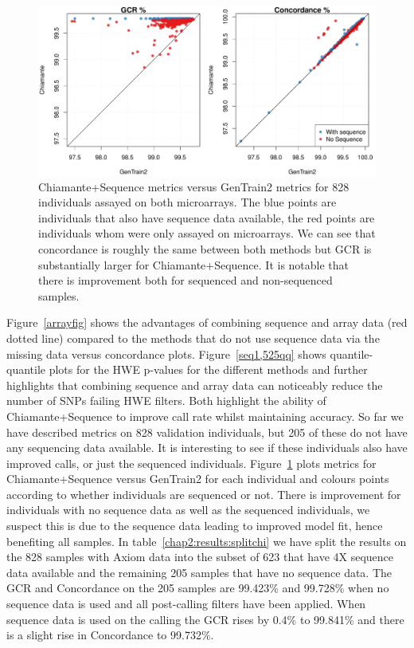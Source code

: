\begin{figure}[p]
  \begin{center} 
    \includegraphics[width=\textwidth]{chap2figs/genotypecalling_byindv}
    \caption[Chiamante versus GenTrain2: per sample performance]{Chiamante+Sequence metrics versus GenTrain2 metrics for 828 individuals assayed on both microarrays.  The blue points are individuals that also have sequence data available, the red points are individuals whom were only assayed on microarrays. We can see that concordance is roughly the same between both methods but GCR is substantially larger for Chiamante+Sequence.  It is notable that there is improvement both for sequenced and non-sequenced samples.\label{seqnoseq}}
  \end{center} 
\end{figure}

Figure~\ref{arrayfig} shows the advantages of combining sequence and array data (red dotted line) compared to the methods that do not use sequence data via the missing data versus concordance plots. Figure~\ref{seq1,525qq} shows quantile-quantile plots for the HWE p-values for the different methods and further highlights that combining sequence and array data can noticeably reduce the number of SNPs failing HWE filters. Both highlight the ability of Chiamante+Sequence to improve call rate whilst maintaining accuracy.
\newpage
So far we have described metrics on 828 validation individuals, but 205 of these do not have any sequencing data available.  It is interesting to see if these individuals also have improved calls, or just the sequenced individuals. Figure~\ref{seqnoseq} plots metrics for Chiamante+Sequence versus GenTrain2 for each individual and colours points according to whether individuals are sequenced or not. There is improvement for individuals with no sequence data as well as the sequenced individuals,  we suspect this is due to the sequence data leading to improved model fit, hence benefiting all samples. In table~\ref{chap2:results:splitchi} we have split the results on the 828 samples with Axiom data into the subset of 623 that have 4X sequence data available and the remaining 205 samples that have no sequence data. The GCR and Concordance on the 205 samples are 99.423\% and 99.728\% when no sequence data is used and all post-calling filters have been applied. When sequence data is used on the calling the GCR rises by 0.4\% to 99.841\% and there is a slight rise in Concordance to 99.732\%.

